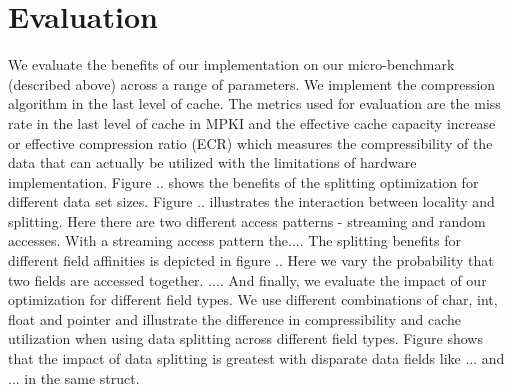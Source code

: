 \section{Evaluation}
\label{sec:eval}
We evaluate the benefits of our implementation on our micro-benchmark (described above) across a range of parameters. We implement the compression algorithm in the last level of cache. The metrics used for evaluation are the miss rate in the last level of cache in MPKI and the effective cache capacity increase or effective compression ratio (ECR) which measures the compressibility of the data that can actually be utilized with the limitations of hardware implementation. Figure .. shows the benefits of the splitting optimization for different data set sizes. Figure .. illustrates the interaction between locality and splitting. Here there are two different access patterns - streaming and random accesses. With a streaming access pattern the.... The splitting benefits for different field affinities is depicted in figure .. Here we vary the probability that two fields are accessed together. .... And finally, we evaluate the impact of our optimization for different field types. We use different combinations of char, int, float and pointer and illustrate the difference in compressibility and cache utilization when using data splitting across different field types. Figure shows that the impact of data splitting is greatest with disparate data fields like ... and ... in the same struct. 
